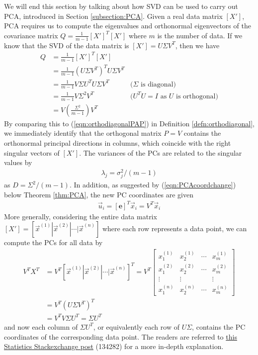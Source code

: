 We will end this section by talking about how SVD can be used to carry out PCA, introduced in Section \ref{subsection:PCA}. Given a real data matrix $[X']$, PCA requires us to compute the eigenvalues and orthonormal eigenvectors of the covariance matrix $Q = \frac{1}{m-1}[X']^T[X']$ where $m$ is the number of data. If we know that the SVD of the data matrix is $[X'] = U\Sigma V^T$, then we have
\begin{align}
Q &= \frac{1}{m-1}[X']^T[X'] \nonumber \\
&= \frac{1}{m-1}(U\Sigma V^T)^TU\Sigma V^T \nonumber \\
&= \frac{1}{m-1}V \Sigma U^T U \Sigma V^T & \text{($\Sigma$ is diagonal)} \nonumber \\
&= \frac{1}{m-1}V \Sigma^2 V^T & \text{($U^TU = I$ as $U$ is orthogonal)} \nonumber \\
&= V(\frac{\Sigma^2}{m-1}) V^T 
\end{align}
By comparing this to (\ref{eqn:orthodiagonalPAP}) in Definition \ref{defn:orthodiagonal}, we immediately identify that the orthogonal matrix $P = V$ contains the orthonormal principal directions in columns, which coincide with the right singular vectors of $[X']$. The variances of the PCs are related to the singular values by 
\begin{align}
\lambda_j = \sigma_j^2/(m-1)    
\end{align} as $D = \Sigma^2/(m-1)$. In addition, as suggested by (\ref{eqn:PCAcoordchange}) below Theorem \ref{thm:PCA}, the new PC coordinates are given \begin{align}
\vec{u}_i = [\textbf{e}]^T \vec{x}_i = V^T \vec{x}_i    
\end{align}
More generally, considering the entire data matrix $[X'] = [\vec{x}^{(1)}|\vec{x}^{(2)}|\cdots|\vec{x}^{(n)}]$ where each row represents a data point, we can compute the PCs for all data by
\begin{align}
V^TX^T &= V^T[\vec{x}^{(1)}|\vec{x}^{(2)}|\cdots|\vec{x}^{(n)}]^T = V^T
\begin{bmatrix}
x^{(1)}_1 & x^{(1)}_2 & \cdots & x^{(1)}_m \\
x^{(2)}_1 & x^{(2)}_2 & \cdots & x^{(2)}_m \\
\vdots & \vdots & & \vdots \\
x^{(n)}_1 & x^{(n)}_2 & \cdots & x^{(n)}_m
\end{bmatrix} \nonumber \\
&= V^T(U\Sigma V^T)^T \nonumber \\
&= V^TV \Sigma U^T = \Sigma U^T
\end{align}
and now each column of $\Sigma U^T$, or equivalently each row of $U\Sigma$, contains the PC coordinates of the corresponding data point. The readers are referred to \href{https://stats.stackexchange.com/questions/134282/relationship-between-svd-and-pca-how-to-use-svd-to-perform-pca}{this Statistics Stackexchange post} (134282) for a more in-depth explanation.

